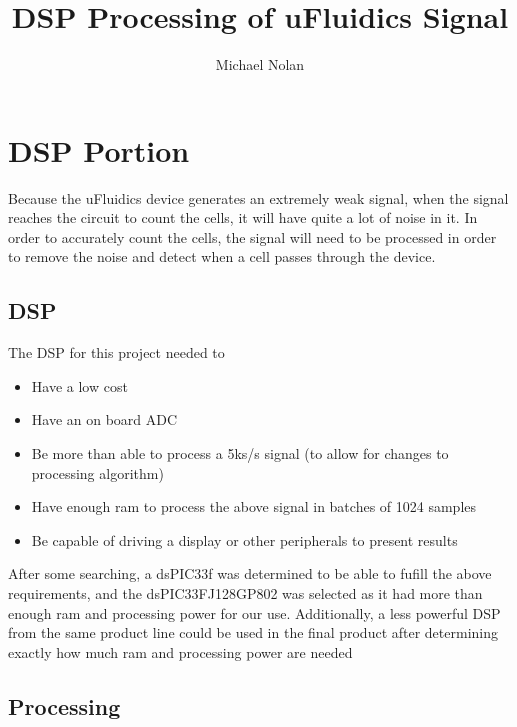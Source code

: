 \documentclass[10pt, journal]{IEEEtran}
\title{DSP Processing of uFluidics Signal}
\author{Michael Nolan}
\begin{document}
\maketitle \par
\section{DSP Portion}
Because the uFluidics device generates an extremely weak signal, when
the signal reaches the circuit to count the cells, it will have quite
a lot of noise in it. In order to accurately count the cells, the
signal will need to be processed in order to remove the noise and
detect when a cell passes through the device.

\subsection{DSP}
The DSP for this project needed to 
\begin{itemize}
\item Have a low cost
\item Have an on board ADC
\item Be more than able to process a 5ks/s signal (to allow for changes to processing algorithm)
\item Have enough ram to process the above signal in batches of 1024 samples
\item Be capable of driving a display or other peripherals to present results
\end{itemize}

After some searching, a dsPIC33f was determined to be able to fufill
the above requirements, and the dsPIC33FJ128GP802 was selected as it
had more than enough ram and processing power for our
use. Additionally, a less powerful DSP from the same product line
could be used in the final product after determining exactly how much
ram and processing power are needed

\subsection{Processing}
\end{document}
